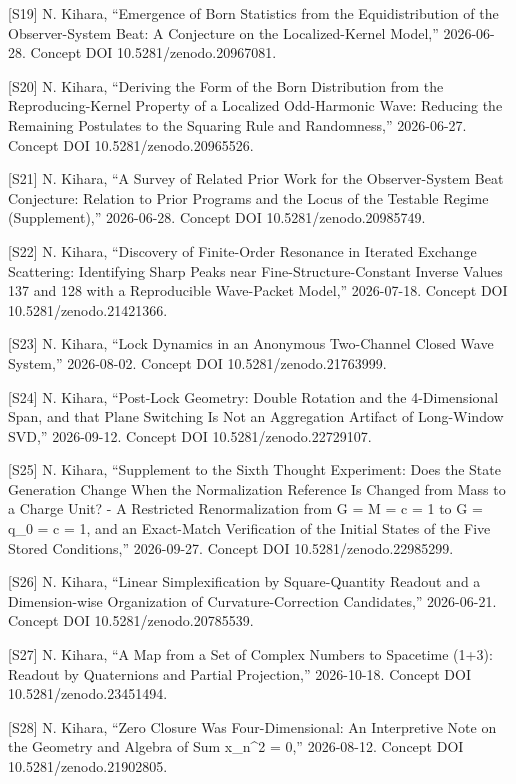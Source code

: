 \documentclass[
  a4paper,
]{article}
\begin{document}
{[}S19{]} N. Kihara, ``Emergence of Born Statistics from the
Equidistribution of the Observer-System Beat: A Conjecture on the
Localized-Kernel Model,'' 2026-06-28. Concept DOI
10.5281/zenodo.20967081.

{[}S20{]} N. Kihara, ``Deriving the Form of the Born Distribution from
the Reproducing-Kernel Property of a Localized Odd-Harmonic Wave:
Reducing the Remaining Postulates to the Squaring Rule and Randomness,''
2026-06-27. Concept DOI 10.5281/zenodo.20965526.

{[}S21{]} N. Kihara, ``A Survey of Related Prior Work for the
Observer-System Beat Conjecture: Relation to Prior Programs and the
Locus of the Testable Regime (Supplement),'' 2026-06-28. Concept DOI
10.5281/zenodo.20985749.

{[}S22{]} N. Kihara, ``Discovery of Finite-Order Resonance in Iterated
Exchange Scattering: Identifying Sharp Peaks near
Fine-Structure-Constant Inverse Values 137 and 128 with a Reproducible
Wave-Packet Model,'' 2026-07-18. Concept DOI 10.5281/zenodo.21421366.

{[}S23{]} N. Kihara, ``Lock Dynamics in an Anonymous Two-Channel Closed
Wave System,'' 2026-08-02. Concept DOI 10.5281/zenodo.21763999.

{[}S24{]} N. Kihara, ``Post-Lock Geometry: Double Rotation and the
4-Dimensional Span, and that Plane Switching Is Not an Aggregation
Artifact of Long-Window SVD,'' 2026-09-12. Concept DOI
10.5281/zenodo.22729107.

{[}S25{]} N. Kihara, ``Supplement to the Sixth Thought Experiment: Does
the State Generation Change When the Normalization Reference Is Changed
from Mass to a Charge Unit? - A Restricted Renormalization from G = M =
c = 1 to G = q\_0 = c = 1, and an Exact-Match Verification of the
Initial States of the Five Stored Conditions,'' 2026-09-27. Concept DOI
10.5281/zenodo.22985299.

{[}S26{]} N. Kihara, ``Linear Simplexification by Square-Quantity
Readout and a Dimension-wise Organization of Curvature-Correction
Candidates,'' 2026-06-21. Concept DOI 10.5281/zenodo.20785539.

{[}S27{]} N. Kihara, ``A Map from a Set of Complex Numbers to Spacetime
(1+3): Readout by Quaternions and Partial Projection,'' 2026-10-18.
Concept DOI 10.5281/zenodo.23451494.

{[}S28{]} N. Kihara, ``Zero Closure Was Four-Dimensional: An
Interpretive Note on the Geometry and Algebra of Sum x\_n\^{}2 = 0,''
2026-08-12. Concept DOI 10.5281/zenodo.21902805.
\end{document}
